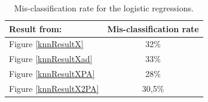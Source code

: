 \begin{table}[H]
\begin{longtable}{lc} \hline
Result from: & Mis-classification rate \\ \hline
Figure \ref{knnResultX} & 32\% \\ 
Figure \ref{knnResultXad} & 33\% \\ 
Figure \ref{knnResultXPA} & 28\% \\ 
Figure \ref{knnResultX2PA} & 30,5\% \\ \hline
\end{longtable}
\caption{Mis-classification rate for the logistic regressions.}
\label{knnErrorRate}
\end{table}





